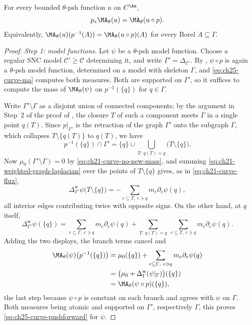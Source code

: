 \begin{proposition}
\label{prop:ch25-curve-pushforward}
For every bounded $\theta$-psh function $u$ on $C^{\An}$,
\begin{equation}
\label{eq:ch25-curve-pushforward}
 p_*\MA_\theta(u)=\MA_\theta(u\circ p).
\end{equation}
Equivalently, $\MA_\theta(u)(p^{-1}(A))=\MA_\theta(u\circ p)(A)$ for every
Borel $A\subseteq\Gamma$.
\end{proposition}

\begin{proof}
\emph{Step 1: model functions.}  Let $\psi$ be a $\theta$-psh model
function.  Choose a regular SNC model $\mathcal C'\geq\mathcal C$
determining it, and write $\Gamma'=\Delta_{\mathcal C'}$.  By
, $\psi\circ p$ is again a $\theta$-psh
model function, determined on a model with skeleton $\Gamma$, and
\eqref{eq:ch25-curve-ma} computes both measures.  Both are supported on
$\Gamma'$, so it suffices to compute the mass of $\MA_\theta(\psi)$ on
$p^{-1}(\{q\})$ for $q\in\Gamma$.

Write $\Gamma'\setminus\Gamma$ as a disjoint union of connected components;
by the argument in Step~2 of the proof of
, the closure $T$ of such a component
meets $\Gamma$ in a single point $q(T)$.  Since
$p|_{\Gamma'}$ is the retraction of the graph $\Gamma'$ onto the
subgraph $\Gamma$, which collapses $T\setminus\{q(T)\}$ to $q(T)$, we
have
\[
 p^{-1}(\{q\})\cap\Gamma'
 =\{q\}\cup\bigcup_{T:\,q(T)=q}\bigl(T\setminus\{q\}\bigr).
\]
Now $\mu_0(\Gamma'\setminus\Gamma)=0$ by
\eqref{eq:ch21-curve-no-new-mass}, and summing
\eqref{eq:ch21-weighted-graph-laplacian} over the points of
$T\setminus\{q\}$ gives, as in \eqref{eq:ch21-curve-flux},
\[
 \Delta^{\mathrm w}_{\Gamma'}\psi\bigl(T\setminus\{q\}\bigr)
 =-\sum_{e\subseteq T,\ e\ni q}m_e\partial_e\psi(q),
\]
all interior edges contributing twice with opposite signs.  On the other
hand, at $q$ itself,
\[
 \Delta^{\mathrm w}_{\Gamma'}\psi(\{q\})
 =\sum_{e\subseteq\Gamma,\ e\ni q}m_e\partial_e\psi(q)
  +\sum_{T:\,q(T)=q}\ \sum_{e\subseteq T,\ e\ni q}
       m_e\partial_e\psi(q).
\]
Adding the two displays, the branch terms cancel and
\[
 \begin{aligned}
 \MA_\theta(\psi)\bigl(p^{-1}(\{q\})\bigr)
 &=\mu_0(\{q\})+
   \sum_{e\subseteq\Gamma,\ e\ni q}m_e\partial_e\psi(q)\\
 &=\bigl(\mu_0+\Delta^{\mathrm w}_\Gamma
                 (\psi|_\Gamma)\bigr)(\{q\})\\
 &=\MA_\theta(\psi\circ p)(\{q\}),
 \end{aligned}
\]
the last step because $\psi\circ p$ is constant on each branch and agrees
with $\psi$ on $\Gamma$.  Both measures being atomic and supported on
$\Gamma'$, respectively $\Gamma$, this proves
\eqref{eq:ch25-curve-pushforward} for $\psi$.


\end{proof}
